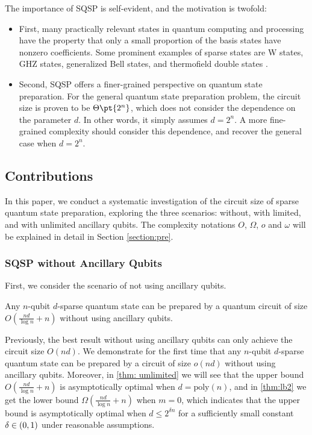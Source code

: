 \documentclass[a4paper,UKenglish,cleveref, autoref, thm-restate]{lipics-v2021}
\DeclarePairedDelimiter\rbra{\lparen}{\rparen}
\newcommand{\ta}{\Theta\pt}
\begin{document}
The importance of SQSP is self-evident, and the motivation is twofold:
\begin{itemize}
\item  First, many practically relevant states in quantum computing and processing have the property that only a small proportion of the basis states have nonzero coefficients.
 Some prominent examples of sparse states are W states, GHZ states,  generalized Bell states, and thermofield double states \cite{cottrell2019build}. 

\item Second,  SQSP offers a finer-grained perspective on quantum state preparation. For the general quantum state preparation problem, the circuit size is proven to be $\ta{2^n}$, which does not consider the dependence on the parameter $d$. In other words, it simply assumes $d=2^n$. A more fine-grained complexity should consider this dependence, and recover the general case when $d=2^n$.
\end{itemize}





\subsection{Contributions} 
In this paper, we conduct a systematic investigation of the circuit size of sparse quantum state preparation, exploring the three scenarios:  without, with limited, and with unlimited ancillary qubits. The complexity notations $O$, $\Omega$, $o$ and $\omega$ will be explained in detail in Section \ref{section:pre}. 

\subsubsection{SQSP without Ancillary Qubits}First, we consider the scenario of not using ancillary qubits.

\begin{theorem}\label{thm:withoutancillary}
   Any $n$-qubit $d$-sparse quantum state can be prepared by a quantum circuit of size $O(\frac{nd}{\log n} + n)$ without using ancillary qubits.
\end{theorem}

  Previously, the best result without using ancillary qubits  \cite{gleinig2021efficient, malvetti2021quantum} can only achieve the circuit size $O(nd)$. We demonstrate for the first time that any $n$-qubit $d$-sparse quantum state can be prepared by a circuit of size $o(nd)$ without using ancillary qubits.
Moreover, in \cref{thm: umlimited} we will see that the upper bound $O(\frac{nd}{\log n} + n)$ is asymptotically optimal when $d = \mathrm{poly}(n)$,  and in \cref{thm:lb2} we get the lower bound $\Omega(\frac{nd}{\log n} + n)$ when $m = 0$, which indicates that the upper bound is asymptotically optimal when $d \leq 2^{\delta n}$ for a sufficiently small constant $\delta \in \rbra{0, 1}$ under reasonable assumptions.
\end{document}
